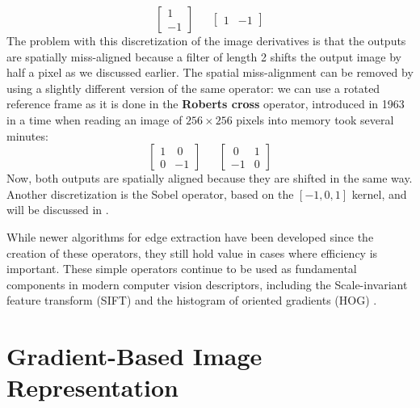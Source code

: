 \begin{equation}
\begin{bmatrix}
  1 \\
  -1
  \end{bmatrix}
  ~~~~~~~
  \begin{bmatrix}
  1 & -1
  \end{bmatrix}
\end{equation}
The problem with this discretization of the image derivatives is that the outputs are spatially miss-aligned because a filter of length 2 shifts the output image by half a pixel as we discussed earlier. The spatial miss-alignment can be removed by using a slightly different version of the same operator: we can use a rotated reference frame as it is done in the {\bf Roberts cross} operator, introduced in 1963 \cite{Roberts63} in a time when reading an image of $256 \times 256$ pixels into memory took several minutes:
\begin{equation}
\begin{bmatrix}
  1 & ~0\\
 0 & -1
  \end{bmatrix}
  ~~~~~~~
  \begin{bmatrix}
  ~0 & 1 \\
  -1 & 0
  \end{bmatrix}
\end{equation}
Now, both outputs are spatially aligned because they are shifted in the same way. Another discretization is the Sobel operator,
based on the $[-1,0,1]$ kernel, and will be discussed in \sect{\ref{sec:derivatives_binomial_filters}}.


While newer algorithms for edge extraction have been developed since the creation of these operators, they still hold value in cases where efficiency is important. These simple operators continue to be used as fundamental components in modern computer vision descriptors, including the Scale-invariant feature transform (SIFT) \cite{Lowe04} and the histogram of oriented gradients (HOG) \cite{Dalal2005}.

\section{Gradient-Based Image Representation}

